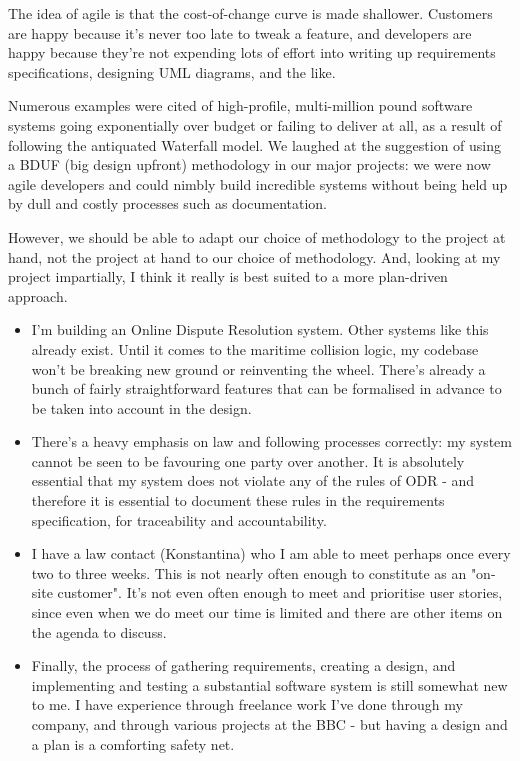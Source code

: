 The idea of agile is that the cost-of-change curve is made shallower. Customers are happy because it's never too late to tweak a feature, and developers are happy because they're not expending lots of effort into writing up requirements specifications, designing UML diagrams, and the like.

Numerous examples were cited of high-profile, multi-million pound software systems going exponentially over budget or failing to deliver at all, as a result of following the antiquated Waterfall model. We laughed at the suggestion of using a BDUF (big design upfront) methodology in our major projects: we were now agile developers and could nimbly build incredible systems without being held up by dull and costly processes such as documentation.

However, we should be able to adapt our choice of methodology to the project at hand, not the project at hand to our choice of methodology. And, looking at my project impartially, I think it really is best suited to a more plan-driven approach.

\begin{itemize}

    \item I'm building an Online Dispute Resolution system. Other systems like this already exist. Until it comes to the maritime collision logic, my codebase won't be breaking new ground or reinventing the wheel. There's already a bunch of fairly straightforward features that can be formalised in advance to be taken into account in the design.
    
    \item There's a heavy emphasis on law and following processes correctly: my system cannot be seen to be favouring one party over another. It is absolutely essential that my system does not violate any of the rules of ODR - and therefore it is essential to document these rules in the requirements specification, for traceability and accountability.
    
    \item I have a law contact (Konstantina) who I am able to meet perhaps once every two to three weeks. This is not nearly often enough to constitute as an "on-site customer". It's not even often enough to meet and prioritise user stories, since even when we do meet our time is limited and there are other items on the agenda to discuss.
    
    \item Finally, the process of gathering requirements, creating a design, and implementing and testing a substantial software system is still somewhat new to me. I have experience through freelance work I've done through my company, and through various projects at the BBC - but having a design and a plan is a comforting safety net.

\end{itemize}

